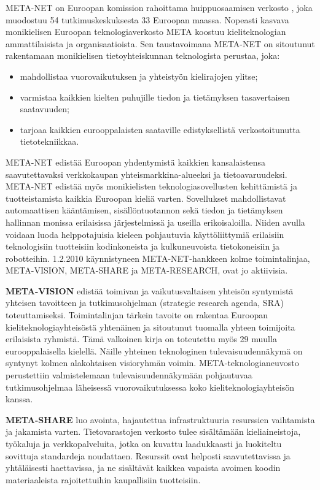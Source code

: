 \cleardoublepage
\begin{multicols}{2}

  META-NET on Euroopan komission rahoittama huippuosaamisen verkosto \cite{rehm2011}, joka muodostuu 54 tutkimuskeskuksesta 33 Euroopan maassa. Nopeasti kasvava monikielisen Euroopan teknologiaverkosto META koostuu kieliteknologian ammattilaisista ja organisaatioista. Sen taustavoimana META-NET on sitoutunut rakentamaan monikielisen tietoyhteiskunnan teknologista perustaa, joka:
\begin{itemize}
\item mahdollistaa vuorovaikutuksen ja yhteistyön kielirajojen ylitse;
\item varmistaa kaikkien kielten puhujille tiedon ja tietämyksen tasavertaisen saatavuuden;
\item tarjoaa kaikkien eurooppalaisten saataville edistyksellistä verkostoitunutta tietotekniikkaa.
\end{itemize}
META-NET edistää Euroopan yhdentymistä kaikkien kansalaistensa saavutettavaksi verkkokaupan yhteismarkkina-alueeksi ja tietoavaruudeksi. META-NET edistää myös monikielisten teknologiasovellusten kehittämistä ja tuotteistamista kaikkia Euroopan kieliä varten. Sovellukset mahdollistavat automaattisen kääntämisen, sisällöntuotannon sekä tiedon ja tietämyksen hallinnan monissa erilaisissa järjestelmissä ja useilla erikoisaloilla. Niiden avulla voidaan luoda helppotajuisia kieleen pohjautuvia käyttöliittymiä erilaisiin teknologisiin tuotteisiin kodinkoneista ja kulkuneuvoista tietokoneisiin ja robotteihin.  1.2.2010 käynnistyneen META-NET-hankkeen kolme toimintalinjaa, META-VISION, META-SHARE ja META-RESEARCH, ovat jo aktiivisia.
\columnbreak

\textbf{META-VISION} edistää toimivan ja vaikutusvaltaisen yhteisön syntymistä yhteisen tavoitteen ja tutkimusohjelman (strategic research agenda, SRA) toteuttamiseksi. Toimintalinjan tärkein tavoite on rakentaa Euroopan kieliteknologiayhteisöstä yhtenäinen ja sitoutunut tuomalla yhteen toimijoita erilaisista ryhmistä. Tämä valkoinen kirja on toteutettu myös 29 muulla eurooppalaisella kielellä. Näille yhteinen teknologinen tulevaisuudennäkymä on syntynyt kolmen alakohtaisen visioryhmän voimin. META-teknologianeuvosto perustettiin valmistelemaan tulevaisuudennäkymään pohjautuvaa tutkimusohjelmaa läheisessä vuorovaikutuksessa koko kieliteknologiayhteisön kanssa.

\textbf{META-SHARE} luo avointa, hajautettua infrastruktuuria resurssien vaihtamista ja jakamista varten. Tietovarastojen verkosto tulee sisältämään kieliaineistoja, työkaluja ja verkkopalveluita, jotka on kuvattu laadukkaasti ja luokiteltu sovittuja standardeja noudattaen. Resurssit ovat helposti saavutettavissa ja yhtäläisesti haettavissa, ja ne sisältävät kaikkea vapaista avoimen koodin materiaaleista rajoitettuihin kaupallisiin tuotteisiin.


\end{multicols}
